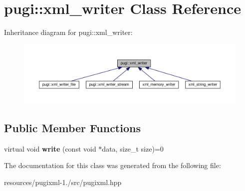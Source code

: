 \hypertarget{classpugi_1_1xml__writer}{\section{pugi\+:\+:xml\+\_\+writer Class Reference}
\label{classpugi_1_1xml__writer}
}


Inheritance diagram for pugi\+:\+:xml\+\_\+writer\+:
\nopagebreak
\begin{figure}[H]
\begin{center}
\leavevmode
\includegraphics[width=350pt]{classpugi_1_1xml__writer__inherit__graph}
\end{center}
\end{figure}
\subsection*{Public Member Functions}
\begin{DoxyCompactItemize}
\item 
\hypertarget{classpugi_1_1xml__writer_ab7d3b6a8499ceef7799158370e1c2617}{virtual void {\bfseries write} (const void $\ast$data, size\+\_\+t size)=0}\label{classpugi_1_1xml__writer_ab7d3b6a8499ceef7799158370e1c2617}

\end{DoxyCompactItemize}


The documentation for this class was generated from the following file\+:\begin{DoxyCompactItemize}
\item 
resources/pugixml-\/1./src/pugixml.\+hpp\end{DoxyCompactItemize}
